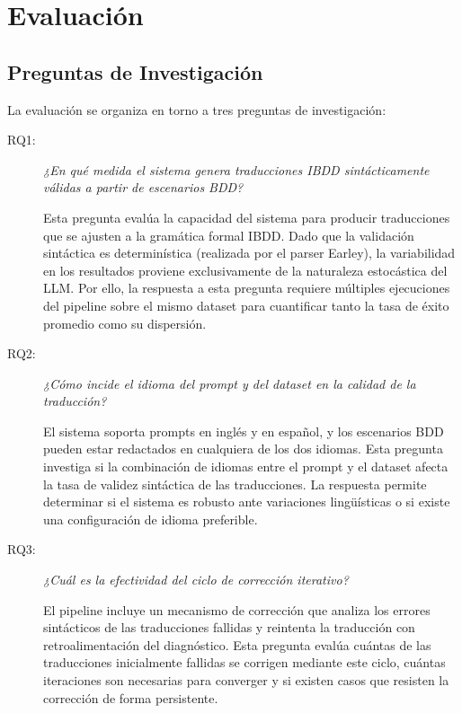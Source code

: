 \chapter{Evaluación}
\label{chap:evaluacion}

\section{Preguntas de Investigación}

La evaluación se organiza en torno a tres preguntas de investigación:

\begin{description}
  \item[RQ1:] \textit{¿En qué medida el sistema genera traducciones IBDD sintácticamente válidas a partir de escenarios BDD?}

  Esta pregunta evalúa la capacidad del sistema para producir traducciones que se ajusten a la gramática formal IBDD. Dado que la validación sintáctica es determinística (realizada por el parser Earley), la variabilidad en los resultados proviene exclusivamente de la naturaleza estocástica del LLM. Por ello, la respuesta a esta pregunta requiere múltiples ejecuciones del pipeline sobre el mismo dataset para cuantificar tanto la tasa de éxito promedio como su dispersión.

  \item[RQ2:] \textit{¿Cómo incide el idioma del prompt y del dataset en la calidad de la traducción?}

  El sistema soporta prompts en inglés y en español, y los escenarios BDD pueden estar redactados en cualquiera de los dos idiomas. Esta pregunta investiga si la combinación de idiomas entre el prompt y el dataset afecta la tasa de validez sintáctica de las traducciones. La respuesta permite determinar si el sistema es robusto ante variaciones lingüísticas o si existe una configuración de idioma preferible.

  \item[RQ3:] \textit{¿Cuál es la efectividad del ciclo de corrección iterativo?}

  El pipeline incluye un mecanismo de corrección que analiza los errores sintácticos de las traducciones fallidas y reintenta la traducción con retroalimentación del diagnóstico. Esta pregunta evalúa cuántas de las traducciones inicialmente fallidas se corrigen mediante este ciclo, cuántas iteraciones son necesarias para converger y si existen casos que resisten la corrección de forma persistente.
\end{description}

